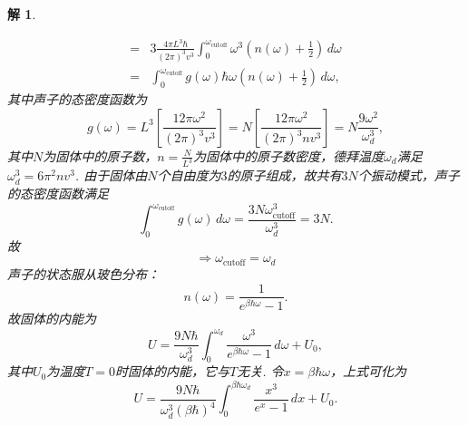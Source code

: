 \documentclass[UTF8,10pt,a4paper]{article}
\theoremstyle{Problem}
\theoremstyle{Solution}
\newtheorem*{sol}{解}
\begin{document}
\begin{sol}
\begin{enumerate}
\begin{itemize}
\begin{align}
                            \nonumber=   & 3\frac{4\pi L^3\hbar}{(2\pi)^3v^3}\int_0^{\omega_{\text{cutoff}}}\omega^3\left(n(\omega)+\frac{1}{2}\right)\,d\omega                                                  \\
                            =            & \int_0^{\omega_\text{cutoff}}g(\omega)\hbar\omega\left(n(\omega)+\frac{1}{2}\right)\,d\omega,
                        \end{align}
                        其中声子的态密度函数为
                        \begin{equation}
                            g(\omega)=L^3\left[\frac{12\pi\omega^2}{(2\pi)^3v^3}\right]=N\left[\frac{12\pi\omega^2}{(2\pi)^3nv^3}\right]=N\frac{9\omega^2}{\omega_d^3},
                        \end{equation}
                        其中$N$为固体中的原子数，$n=\frac{N}{L^3}$为固体中的原子数密度，德拜温度$\omega_d$满足$\omega_d^3=6\pi^2nv^3$. 由于固体由$N$个自由度为$3$的原子组成，故共有$3N$个振动模式，声子的态密度函数满足
                        \begin{equation}
                            \int_0^{\omega_{\text{cutoff}}}g(\omega)\,d\omega=\frac{3N\omega_{\text{cutoff}}^3}{\omega_d^3}=3N.
                        \end{equation}
                        故
                        \begin{equation}
                            \Longrightarrow\omega_{\text{cutoff}}=\omega_d
                        \end{equation}
                        声子的状态服从玻色分布：
                        \begin{equation}
                            n(\omega)=\frac{1}{e^{\beta\hbar\omega}-1}.
                        \end{equation}
                        故固体的内能为
                        \begin{equation}
                            U=\frac{9N\hbar}{\omega_d^3}\int_0^{\omega_d}\frac{\omega^3}{e^{\beta\hbar\omega}-1}\,d\omega+U_0,
                        \end{equation}
                        其中$U_0$为温度$T=0$时固体的内能，它与$T$无关.
                        令$x=\beta\hbar\omega$，上式可化为
                        \begin{equation}
                            U=\frac{9N\hbar}{\omega_d^3(\beta\hbar)^4}\int_0^{\beta\hbar\omega_d}\frac{x^3}{e^x-1}\,dx+U_0.
                        \end{equation}

\end{itemize}
\end{enumerate}
\end{sol}
\end{document}
